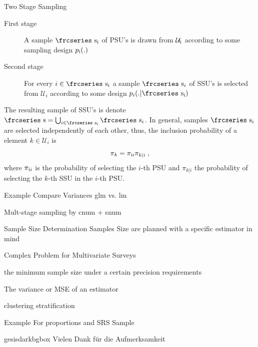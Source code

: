 \documentclass{beamer}\usepackage[]{graphicx}\usepackage[]{color}
\newcommand{\textfrc}[1]{{\frcseries#1}}
\newcommand{\mathfrc}[1]{\text{\textfrc{#1}}}
\newcommand{\RN}[1]{%
  \textup{\uppercase\expandafter{\romannumeral#1}}%
}
\begin{document}
\begin{frame}{Two Stage Sampling}
 \begin{description}
 \item[First  stage] A sample $\mathfrc{s}_{\RN{1}}$ of PSU's is drawn from $\mathcal{U}_{\RN{1}}$ according to some sampling design $p_{\RN{1}}(.)$
 \item[Second stage] For every $i \in \mathfrc{s}_{\RN{1}}$ a sample $\mathfrc{s}_i$ of SSU's is selected from $\mathcal{U}_i$ according to some design $p_i(.|\mathfrc{s}_{\RN{1}})$
 \end{description}
 The resulting sample of SSU's is denote $\mathfrc{s}= \bigcup_{i \in \mathfrc{s}_{\RN{1}}} \mathfrc{s}_i $.
 In general, samples $\mathfrc{s}_i$ are selected independently of each other, thus, the inclusion probability of a element $k \in \mathcal{U}_i$ is
$$\pi_k=\pi_{\RN{1}i}\pi_{k|i}\;,$$
where $\pi_{\RN{1}i}$ is the probability of selecting the $i$-th PSU and $\pi_{k|i}$  the probability of selecting
the $k$-th SSU in the $i$-th PSU.
\end{frame}


\begin{frame}{Example}
Compare Variances
glm vs. lm

Mult-stage sampling  by cnum + snum

\end{frame}


\begin{frame}{Sample Size Determination}
Samples Size are planned with a specific estimator in mind

Complex Problem for Multivariate Surveys

the minimum sample size under a certain precision requirements

The variance or MSE of an estimator

clustering stratification

\end{frame}

\begin{frame}{Example}
For proportions and SRS Sample
\end{frame}


\begin{frame}

\begin{beamercolorbox}[wd=\paperwidth,center,sep=1cm]{gesisdarkbgbox}
   Vielen Dank für die Aufmerksamkeit
\end{beamercolorbox}
\end{frame}
\end{document}
